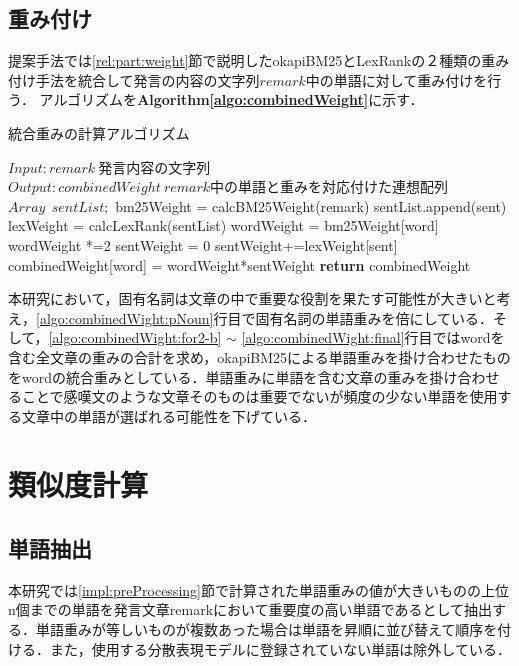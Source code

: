 \subsection{重み付け}
\label{impl:preProcessing:weight}
提案手法では\ref{rel:part:weight}節で説明したokapiBM25とLexRankの２種類の重み付け手法を統合して発言の内容の文字列$remark$中の単語に対して重み付けを行う．
アルゴリズムを\textbf{Algorithm\ref{algo:combinedWeight}}に示す．
\begin{algorithm}
\caption{統合重みの計算アルゴリズム} \label{algo:combinedWeight}
\begin{algorithmic}[1]
\State $Input: remark  ~ 発言内容の文字列$
\State $Output:  combinedWeight ~ remark中の単語と重みを対応付けた連想配列$
\State $Array ~~ sentList;$ 
	\State bm25Weight = calcBM25Weight(remark)\label{algo:combinedWight:bm25}
		\State sentList.append(sent)
	\EndFor
	\State lexWeight = calcLexRank(sentList)
	 \label{algo:combinedWight:for1-b}
	 	\State wordWeight = bm25Weight[word]
			\State wordWeight *=2\label{algo:combinedWight:pNoun}
		\EndIf
		\State sentWeight = 0
		\label{algo:combinedWight:for2-b}
				\State sentWeight+=lexWeight[sent]
			\EndIf
		\EndFor\label{algo:combinedWight:for2-e}
		\State combinedWeight[word] = wordWeight*sentWeight \label{algo:combinedWight:final}
	 \EndFor\label{algo:combinedWeight:for1-e}
	\State \textbf{return} combinedWeight
\EndProcedure
\end{algorithmic}
\end{algorithm}

本研究において，固有名詞は文章の中で重要な役割を果たす可能性が大きいと考え，\ref{algo:combinedWight:pNoun}行目で固有名詞の単語重みを倍にしている．そして，\ref{algo:combinedWight:for2-b} $\sim$ \ref{algo:combinedWight:final}行目ではwordを含む全文章の重みの合計を求め，okapiBM25による単語重みを掛け合わせたものをwordの統合重みとしている．単語重みに単語を含む文章の重みを掛け合わせることで感嘆文のような文章そのものは重要でないが頻度の少ない単語を使用する文章中の単語が選ばれる可能性を下げている．
\section{類似度計算}
\label{impl:similarity}
\subsection{単語抽出}
\label{impl:similarity:extract}
本研究では\ref{impl:preProcessing}節で計算された単語重みの値が大きいものの上位n個までの単語を発言文章remarkにおいて重要度の高い単語であるとして抽出する．単語重みが等しいものが複数あった場合は単語を昇順に並び替えて順序を付ける．また，使用する分散表現モデルに登録されていない単語は除外している．
